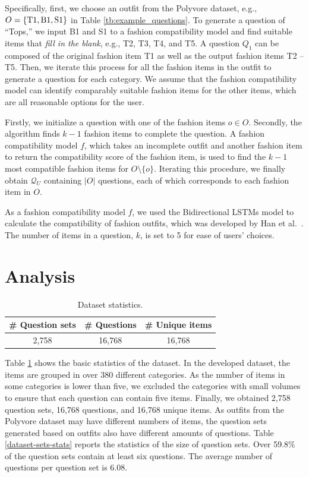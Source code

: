 Specifically, first, we choose an outfit from the Polyvore dataset,
e.g., $O = \left\{{\rm T1}, {\rm B1}, {\rm S1} \right\}$ in Table \ref{tb:example_questions}.
To generate a question of ``Tops,''
we input B1 and S1 to a fashion compatibility model
and find suitable items that {\it fill in the blank}, e.g., T2, T3, T4, and T5.
A question $Q_1$ can be composed of the original fashion item T1
as well as the output fashion items T2 -- T5.
Then, we iterate this process for all the fashion items in the outfit to generate a question for each category.
We assume that the fashion compatibility model
can identify comparably suitable fashion items for the other items,
which are all reasonable options for the user. 


Firstly, we initialize a question with one of the fashion items $o \in O$.
Secondly, the algorithm finds $k-1$ fashion items to complete the question.
A fashion compatibility model $f$, which takes an incomplete outfit and another fashion item to return the compatibility score of the fashion item, is used to find the $k-1$ most compatible fashion items for $O \setminus \{ o \}$. 
Iterating this procedure, we finally obtain $\mathcal{Q}_U$ containing $|O|$ questions, each of which corresponds to each fashion item in $O$.


As a fashion compatibility model $f$, we used the Bidirectional LSTMs model to calculate the compatibility of fashion outfits, which was developed by Han et al.~\cite{han2017learning}. 
The number of items in a question, $k$, is set to 5 for ease of users' choices. 


\section{Analysis}
\label{sq:analysis}

\begin{table}[t]
\caption{Dataset statistics.}
\centering
\begin{tabular}{ccc}
\toprule
\# Question sets&\# Questions&\# Unique items\\
\midrule
2,758&16,768&16,768\\
\bottomrule
\end{tabular}
\label{dataset-basic-stats}
\end{table}

Table \ref{dataset-basic-stats} shows the basic statistics of the dataset.
In the developed dataset, the items are grouped in over 380 different categories.
As the number of items in some categories is lower than five, 
we excluded the categories with small volumes to ensure that each question can contain five items.
Finally, we obtained 2,758 question sets, 16,768 questions, and 16,768 unique items.
As outfits from the Polyvore dataset may have different numbers of items,
the question sets generated based on outfits also have different amounts of questions.
Table \ref{dataset-sets-stats} reports the statistics of the size of question sets. 
Over 59.8\% of the question sets contain at least six questions. 
The average number of questions per question set is 6.08.

